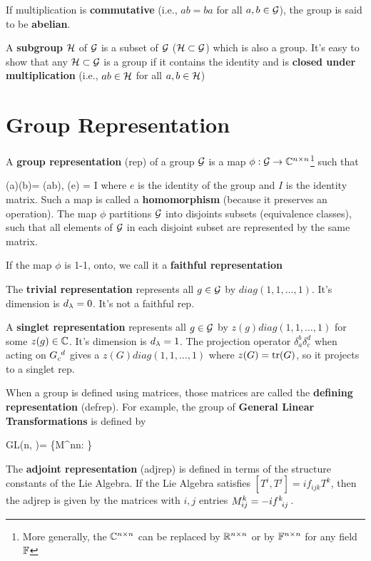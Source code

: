 If multiplication is
{\bf commutative}
(i.e., $ab=ba$ for all $a,b\in{\cal G}$),
the group is said to be {\bf abelian}.

A {\bf subgroup} ${\cal H}$ 
of ${\cal G}$
is a subset of ${\cal G}$
(${\cal H} \subset {\cal G}$)
which is also a group.
It's easy to show that any ${\cal H}\subset {\cal G}$ is a group if it
contains the identity
and is {\bf closed 
under multiplication} (i.e., $ab\in {\cal H}$ for all $a,b\in {\cal H}$) 



\section{Group  Representation}

A {\bf group representation} (rep)
of a group ${\cal G}$
is a map $\phi: {\cal G}\rightarrow { \mathbb{C}}^{n\times n}$\footnote{More generally, the ${ \mathbb{C}}^{n\times n}$ can be replaced by ${ \mathbb{R}}^{n\times n}$ or by ${ \mathbb{F}}^{n\times n}$ for any field ${ \mathbb{F}}$} such that

\beq
\phi(a)\phi(b)=
\phi(ab),
\quad \phi(e) = I
\eeq
where $e$ is the
identity of the group
and $I$ 
is the identity matrix.
Such a map is called a {\bf homomorphism}
(because it preserves an operation).
The map $\phi$ 
partitions ${\cal G}$
into disjoints subsets (equivalence classes),
such that all elements of ${\cal G}$ in each disjoint subset 
are represented by the same matrix.

If the map $\phi$
is 1-1, onto, we call it a {\bf faithful representation} 

The {\bf trivial representation} 
represents all $g\in {\cal G}$
by  $diag(1,1, \dots, 1)$.
It's dimension is $d_\lambda=0$.
It's not a faithful rep.

A {\bf singlet representation}
represents all
$g\in {\cal G}$
by  $ z(g) diag(1,1, \dots, 1)$
for some $z(g)\in{ \mathbb{C}}$.
It's dimension is $d_\lambda=1$.
The projection operator
$\delta_a^b \delta_c^d$
when acting on $G\indices{_c^d}$
gives a $ z(G) diag(1,1, \dots, 1)$
where $z(G)={\rm tr }(G)$, so it
projects to a singlet rep.



When a group is 
defined using matrices, those
matrices are called the {\bf defining representation} (defrep). For example,
the group
of {\bf General Linear Transformations}
is defined by

\beq
GL(n, \CC)=
\{M\in \CC^{n\times n}: \}
\eeq

The {\bf adjoint representation} (adjrep)
is defined in terms of the structure constants
of the Lie Algebra. If the Lie Algebra satisfies
$[T^i, T^j]= if_{ijk}T^k$,
then the adjrep is given by the matrices 
with $i,j$ entries $M^k_{ij}=-if\indices{^k_i_j}$.

